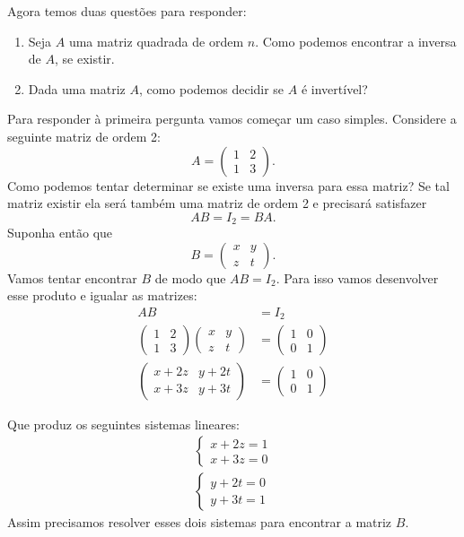 Agora temos duas questões para responder:
\begin{enumerate}[label={\arabic*})]
    \item Seja $A$ uma matriz quadrada de ordem $n$. Como podemos encontrar a inversa de $A$, se existir.

    \item Dada uma matriz $A$, como podemos decidir se $A$ é invertível?
\end{enumerate}

Para responder à primeira pergunta vamos começar um caso simples. Considere a seguinte matriz de ordem 2:
\[
    A = \begin{pmatrix}
        1 & 2\\1 & 3
    \end{pmatrix}.
\]
Como podemos tentar determinar se existe uma inversa para essa matriz? Se tal matriz existir ela será também uma matriz de ordem 2 e precisará satisfazer
\[
    AB = I_2 = BA.
\]
Suponha então que
\[
    B = \begin{pmatrix}
        x & y\\z & t
    \end{pmatrix}.
\]
Vamos tentar encontrar $B$ de modo que $AB = I_2$. Para isso vamos desenvolver esse produto e igualar as matrizes:
\begin{align*}
    AB &= I_2\\
    \begin{pmatrix}1 & 2\\1 & 3\end{pmatrix}\begin{pmatrix}x & y\\z & t\end{pmatrix} &= \begin{pmatrix}1 & 0\\0 & 1\end{pmatrix}\\
    \begin{pmatrix}x + 2z & y + 2t\\x + 3z & y + 3t\end{pmatrix} &= \begin{pmatrix}1 & 0\\0 & 1\end{pmatrix}
\end{align*}

Que produz os seguintes sistemas lineares:
\begin{align}
    \begin{cases}\label{primeirosistema}
        x + 2z = 1\\
        x + 3z = 0
    \end{cases}\\
    \begin{cases}\label{segundosistema}
        y + 2t = 0\\
        y + 3t = 1
    \end{cases}
\end{align}
Assim precisamos resolver esses dois sistemas para encontrar a matriz $B$.

